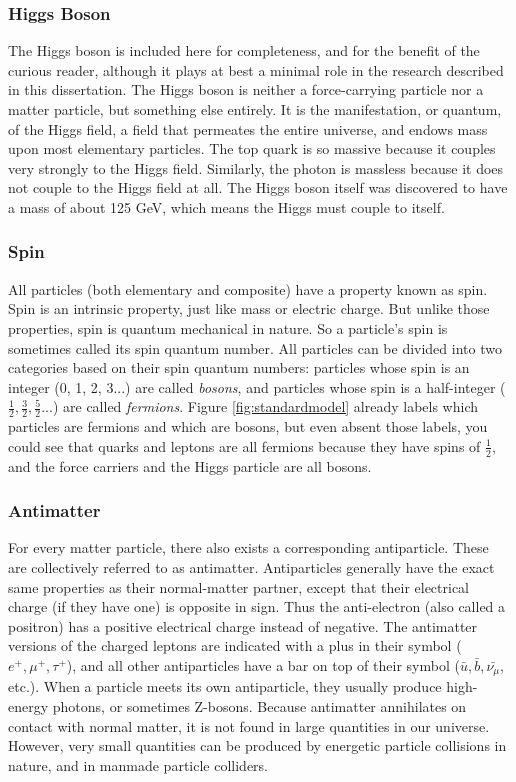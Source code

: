 \subsubsection*{Higgs Boson}
The Higgs boson is included here for completeness, and for the benefit
of the curious reader, although it plays at best a minimal
role in the research described in this dissertation. The Higgs
boson is neither a force-carrying particle nor a matter particle, but
something else entirely. It is the manifestation, or quantum, of the
Higgs field, a field that permeates the entire universe, and endows
mass upon most elementary particles. The top quark is so massive
because it couples very strongly to the Higgs field. Similarly, the
photon is massless because it does not couple to the Higgs field at all.
The Higgs boson itself was discovered to have a mass of about 125 GeV,
which means the Higgs must couple to itself.

\subsubsection*{Spin}
All particles (both elementary and composite) have
a property known as spin. Spin is an intrinsic property, just like
mass or electric charge. But unlike those properties, spin is quantum
mechanical in nature. So a particle's spin is sometimes called its
spin quantum number. All particles can be divided into two categories
based on their spin quantum numbers: particles whose spin is an
integer (0, 1, 2, 3...) are called \emph{bosons}, and particles whose
spin is a half-integer ($\frac{1}{2}, \frac{3}{2}, \frac{5}{2}...$)
are called \emph{fermions}. Figure \ref{fig:standardmodel} already
labels which particles are fermions and which are bosons, but even
absent those labels, you could see that quarks and leptons are all
fermions because they have spins of $\frac{1}{2}$, and the force
carriers and the Higgs particle are all bosons.

\subsubsection*{Antimatter}
For every matter particle, there also exists a corresponding
antiparticle. These are collectively referred to as
antimatter. Antiparticles generally have the exact same properties as
their normal-matter partner, except that their electrical charge (if
they have one) is opposite in sign. Thus the anti-electron (also
called a positron) has a positive electrical charge instead of
negative. The antimatter versions of the charged leptons are indicated
with a plus in their symbol ($e^+, \mu^+, \tau^+$), and all other
antiparticles have a bar on top of their symbol ($\bar{u},
\bar{b}, \bar{\nu_{\mu}}$, etc.). When a particle meets its own
antiparticle, they usually produce high-energy photons, or sometimes
Z-bosons. Because antimatter
annihilates on contact with normal matter, it is not found
in large quantities in our universe. However, very small quantities can be
produced by energetic particle collisions in nature, and in manmade
particle colliders.

